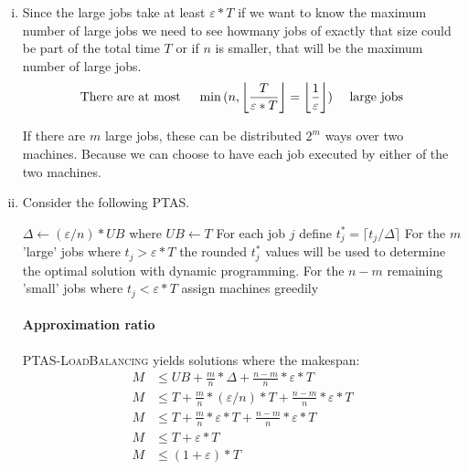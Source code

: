 \begin{enumerate}[(i)]
	\item Since the large jobs take at least $\varepsilon * T$ if we want to know the maximum number of large jobs we need to see howmany jobs of exactly that size could be part of the total time $T$ or if $n$ is smaller, that will be the maximum number of large jobs. 
\[ \text{There are at most \hspace*{10pt}} \min{(n,\left \lfloor\frac{T}{\varepsilon * T} \right \rfloor = \left \lfloor \frac{1}{\varepsilon} \right \rfloor)} \text{\hspace*{10pt} large jobs} \] 

If there are $m$ large jobs, these can be distributed $2^m$ ways over two machines. Because we can choose to have each job executed by either of the two machines.
	\item Consider the following PTAS.

\begin{sourcecode}
$\Delta \leftarrow (\varepsilon / n) * UB$ where $UB \leftarrow T$ 
For each job $j$ define $t_j^* = \lceil t_j / \Delta \rceil$
For the $m$ 'large' jobs where $t_j > \varepsilon * T$ the rounded $t_j^*$ values will be used to determine the optimal solution with dynamic programming. 
For the $n-m$ remaining 'small' jobs where $t_j < \varepsilon * T$ assign machines greedily 
\qend
\end{sourcecode}

	\paragraph{Approximation ratio} \textsc{PTAS-LoadBalancing} yields solutions where the makespan:
	\begin{align}
		M &\leq UB + \frac{m}{n} * \Delta + \frac{n-m}{n} * \varepsilon * T\\
		M &\leq T + \frac{m}{n} * (\varepsilon / n) * T + \frac{n-m}{n} * \varepsilon * T\\
		M &\leq T + \frac{m}{n} * \varepsilon * T + \frac{n-m}{n} * \varepsilon * T\\
		M &\leq T + \varepsilon * T\\
		M &\leq (1+\varepsilon) * T\\
	\end{align}


\end{enumerate}
